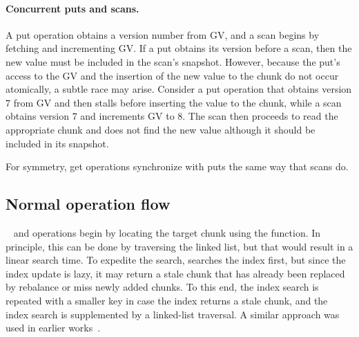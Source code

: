 \paragraph{Concurrent puts and scans.}

A put operation obtains a version number from GV, and a scan begins by fetching and incrementing GV.
If a put obtains its version before a scan, then the new value must be included in the scan's snapshot. 
However, because the put's access to the GV and the insertion of the new value to the chunk do not occur atomically,
a subtle race may arise. Consider a put operation that obtains version $7$ from GV and then stalls before
inserting the value to the chunk, while a scan obtains version $7$ and increments GV to $8$. The scan then proceeds 
to read the appropriate chunk and does not find the new value although it should be included in its snapshot.

For symmetry, get operations synchronize with puts the same way that scans do. 

\subsection{Normal operation flow}
\label{ssec:ops}

\sys\  and  operations begin by locating the target chunk using the  function. In principle, this can be done by traversing the linked list, but that would result in a linear search time. To expedite the search,    searches the index first, but since the index update is lazy, it may return a stale chunk that has already been replaced by rebalance or miss newly added chunks. To this end, the index search is repeated with a smaller key in case the index returns a stale chunk, and the index search is supplemented by a linked-list traversal. A similar approach was used in earlier works~\cite{kiwi,tdsl}. 

